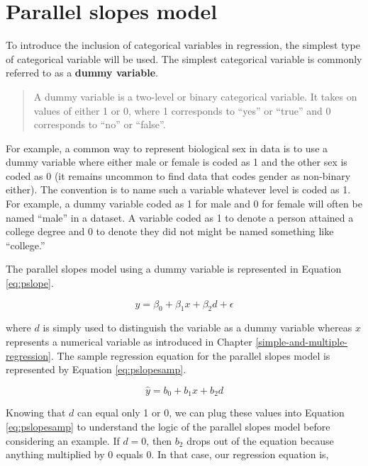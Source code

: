 \documentclass[
]{book}
\begin{document}
\hypertarget{parallel-slopes-model}{%
\section{Parallel slopes model}\label{parallel-slopes-model}}

To introduce the inclusion of categorical variables in regression, the simplest type of categorical variable will be used. The simplest categorical variable is commonly referred to as a \textbf{dummy variable}.

\begin{quote}
A dummy variable is a two-level or binary categorical variable. It takes on values of either 1 or 0, where 1 corresponds to ``yes'' or ``true'' and 0 corresponds to ``no'' or ``false''.
\end{quote}

For example, a common way to represent biological sex in data is to use a dummy variable where either male or female is coded as 1 and the other sex is coded as 0 (it remains uncommon to find data that codes gender as non-binary either). The convention is to name such a variable whatever level is coded as 1. For example, a dummy variable coded as 1 for male and 0 for female will often be named ``male'' in a dataset. A variable coded as 1 to denote a person attained a college degree and 0 to denote they did not might be named something like ``college.''

The parallel slopes model using a dummy variable is represented in Equation \eqref{eq:pslope}.

\begin{equation}
y = \beta_0 + \beta_1x + \beta_2d + \epsilon
\label{eq:pslope}
\end{equation}

where \(d\) is simply used to distinguish the variable as a dummy variable whereas \(x\) represents a numerical variable as introduced in Chapter \ref{simple-and-multiple-regression}. The sample regression equation for the parallel slopes model is represented by Equation \eqref{eq:pslopesamp}.

\begin{equation}
\hat{y} = b_0 + b_1x + b_2d
\label{eq:pslopesamp}
\end{equation}

Knowing that \(d\) can equal only 1 or 0, we can plug these values into Equation \eqref{eq:pslopesamp} to understand the logic of the parallel slopes model before considering an example. If \(d=0\), then \(b_2\) drops out of the equation because anything multiplied by 0 equals 0. In that case, our regression equation is,
\end{document}
